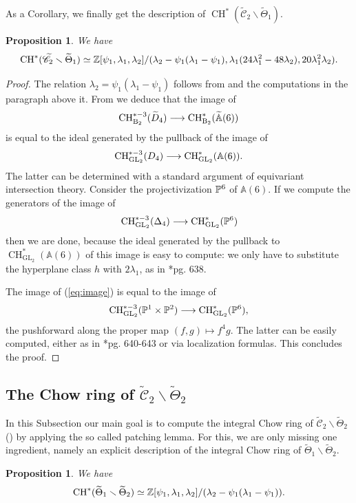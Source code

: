 \documentclass[a4paper, 10pt]{amsart}
\numberwithin{equation}{section}
\numberwithin{subsection}{section}
\newtheorem{proposition}[theorem]{Proposition}
\theoremstyle{definition}
\theoremstyle{remark}
\renewcommand{\mathcal}{\mathscr}
\renewcommand\AA{\mathbb{A}} \newcommand\BB{\mathbb{B}}
\renewcommand{\setminus}{\smallsetminus}
\newcommand{\GL}{\mathrm{GL}}
\newcommand{\Ctilde}{\widetilde{\mathcal C}}
\newcommand{\ThTilde}{\widetilde{\Theta}}
\newcommand{\ch}[1][*]{\operatorname{CH}^{#1}}
\begin{document}
	As a Corollary, we finally get the description of $\ch(\Ctilde_2 \setminus \ThTilde_1)$.
	\begin{proposition}\label{prop:chow C minus Theta1}
		We have
		\[ \ch(\Ctilde_2\smallsetminus\ThTilde_1)\simeq \ZZ[\psi_1,\lambda_1,\lambda_2]/(\lambda_2-\psi_1(\lambda_1-\psi_1),\lambda_1(24\lambda_1^2-48\lambda_2),20\lambda_1^2\lambda_2). \]
	\end{proposition}
	\begin{proof}
	    The relation $\lambda_2=\psi_1(\lambda_1-\psi_1)$ follows from  and the computations in the paragraph above it.
		From  we deduce that the image of
		\[ {\rm{CH}}^{*-3}_{\rm B_2}(\widetilde{D}_4) \longrightarrow \ch_{\rm B_2}(\widetilde{\AA}(6)) \]
		is equal to the ideal generated by the pullback of the image of 
		\[ {\rm{CH}}^{*-3}_{\GL_2}(D_4) \longrightarrow \ch_{\GL_2}(\AA(6)). \]
		The latter can be determined with a standard argument of equivariant intersection theory. Consider the projectivization $\mathbb{P}^6$ of $\AA(6)$. If we compute the generators of the image of
		\begin{equation}\label{eq:image} {\rm{CH}}^{*-3}_{\GL_2}(\Delta_4) \longrightarrow \ch_{\GL_2}(\PP^6) \end{equation}
		then we are done, because the ideal generated by the pullback to $\ch_{\GL_2}(\AA(6))$ of this image is easy to compute: we only have to substitute the hyperplane class $h$ with $2\lambda_1$, as in  \cite{VisM2}*{pg. 638}.
		
		The image of (\ref{eq:image}) is equal to the image of
		\[ {\rm{CH}}_{\GL_2}^{*-3}(\PP^1\times\PP^2)\longrightarrow \ch_{\GL_2}(\PP^6),\]
		the pushforward along the proper map $(f,g)\mapsto f^4g$. The latter can be easily computed, either as in \cite{VisM2}*{pg. 640-643} or via localization formulas. This concludes the proof.
	\end{proof}
	
	\subsection{The Chow ring of $\Ctilde_2\smallsetminus\ThTilde_2$}
	In this Subsection our main goal is to compute the integral Chow ring of $\Ctilde_2\smallsetminus\ThTilde_2$ () by applying the so called patching lemma. For this, we are only missing one ingredient, namely an explicit description of the integral Chow ring of $\ThTilde_1\smallsetminus\ThTilde_2$.
	\begin{proposition}\label{prop:chow ThTilde1 minus ThTilde2}
		We have
		\[ \ch(\ThTilde_1\smallsetminus\ThTilde_2)\simeq \ZZ[\psi_1,\lambda_1,\lambda_2]/(\lambda_2-\psi_1(\lambda_1-\psi_1)).\]
	\end{proposition}
	
\end{document}
